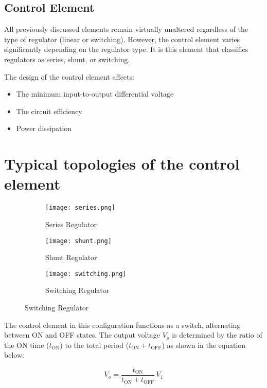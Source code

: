 \documentclass[a4paper,9pt,twoside,openany,twocolumn]{memoir}
\begin{document}
\subsection{Control Element}

All previously discussed elements remain virtually unaltered regardless of the type of regulator (linear or switching). However, the control element varies significantly depending on the regulator type. It is this element that classifies regulators as series, shunt, or switching. 

The design of the control element affects:
\begin{itemize}
    \item The minimum input-to-output differential voltage
    \item The circuit efficiency
    \item Power dissipation
\end{itemize}
\section{Typical topologies of the control element}
\begin{figure}[H] %
    \centering
    \begin{subfigure}{0.25\textwidth}
        \texttt{[image: series.png]}
        \caption{Series Regulator}
        \label{fig:series-regulator}
    \end{subfigure}
    \hfill %
    \begin{subfigure}{0.3\textwidth}
        \texttt{[image: shunt.png]}
        \caption{Shunt Regulator}
        \label{fig:shunt-regulator}
    \end{subfigure}
    \hfill
    \begin{subfigure}{0.25\textwidth}
        \texttt{[image: switching.png]}
        \caption{Switching Regulator}
        \label{fig:switching-regulator}
    \end{subfigure}
    \label{fig:regulator-types}
\end{figure}


The control element in this configuration functions as a switch, alternating between ON and OFF states. The output voltage \( V_o \) is determined by the ratio of the ON time (\( t_{\text{ON}} \)) to the total period (\( t_{\text{ON}} + t_{\text{OFF}} \)) as shown in the equation below:

\[
V_o = \frac{t_{\text{ON}}}{t_{\text{ON}} + t_{\text{OFF}}} \, V_1
\]
\end{document}
